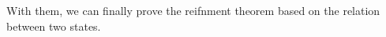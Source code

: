 %         
%
%

With them, 
we can finally prove the reifnment theorem based on the relation between 
two states.  

\begin{lemma}

\end{lemma}

